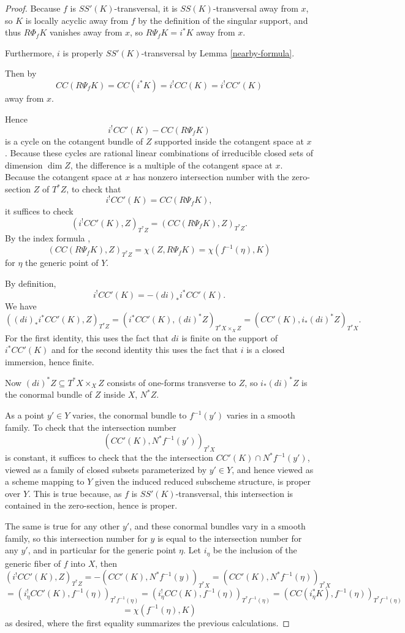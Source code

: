 \begin{proof} Because $f$ is $SS'(K)$-transversal, it is $SS(K)$-transversal away from $x$, so $K$ is locally acyclic away from $f$ by the definition of the singular support, and thus $R \Phi_f K$ vanishes away from $x$, so $R \Psi_f K = i^* K$ away from $x$.

Furthermore, $i$ is properly $SS'(K)$-transversal by Lemma \ref{nearby-formula}.

Then by \cite[Theorem 7.6]{saito1} \[  CC ( R \Psi_{f} K) = CC( i^* K ) = i^! CC(K) = i^! CC'(K) \] away from $x$.

Hence \[i^! CC'(K) -  CC ( R \Psi_{f} K) \] is a cycle on the cotangent bundle of $Z$ supported inside the cotangent space at $x$. Because these cycles are rational linear combinations of irreducible closed sets of dimension $\dim Z$, the difference is a multiple of the cotangent space at $x$. Because the cotangent space at $x$ has nonzero intersection number with the zero-section $Z$ of $T^* Z$, to check that \[ i^! CC'(K) = CC(R\Psi_f K),\] it suffices to check \[ (i^! CC'(K) , Z)_{T^*Z}=   (CC ( R \Psi_{f} K) , Z)_{T^*Z} . \] By the index formula \cite[Theorem 7 .13]{saito1},  \[ (CC ( R \Psi_{f} K) , Z)_{T^*Z} =  \chi(Z, R \Psi_f K) =\chi ( f^{-1}(\eta),K)\] for $\eta$ the generic point of $Y$.

By definition, \[i^! CC'(K) = - (di)_* i^*  CC'(K).\] We have \cite[Proposition 8.1.1(c)]{Fulton}
\[  ((di)_* i^* CC'(K), Z)_{T^*Z} = (i^* CC'(K),  (di)^* Z)_{T^*X \times_X Z} = (CC'(K), i_* (di)^* Z) _{T^*X} .\]
For the first identity, this uses the fact that $di$ is finite on the support of $i^* CC'(K)$ and for the second identity this uses the fact that $i$ is a closed immersion, hence finite.

Now $(di)^ * Z \subseteq  T^* X \times_X Z$ consists of one-forms transverse to $Z$, so $i_* (di)^* Z$ is the conormal bundle of $Z$ inside $X$, $N^*Z$.

As a point $y' \in Y$ varies, the conormal bundle to $f^{-1}(y')$ varies in a smooth family. To check that the intersection number  \[ (CC'(K), N^*f^{-1} (y') )_{T^*X} \] is constant, it suffices to check that the the intersection $ CC'(K) \cap N^*f^{-1} (y') $, viewed as a family of closed subsets parameterized by $y' \in Y$, and hence viewed as a scheme mapping to $Y$ given the induced reduced subscheme structure, is proper over $Y$. This is true because, as $f$ is $SS'(K)$-transversal, this intersection is contained in the zero-section, hence is proper.

The same is true for any other $y'$, and these conormal bundles vary in a smooth family, so this intersection number for $y$ is equal to the intersection number for any $y'$, and in particular for the generic point $\eta$. Let $i_\eta$ be the inclusion of the generic fiber of $f$ into $X$, then \[( i^! CC'(K), Z)_{T^*Z}  = - (CC'(K),  N^* f^{-1}(y))_{T^*X} = (CC'(K), N^* f^{-1}(\eta))_{T^*X}\]
\[ = (i_\eta^! CC'(K), f^{-1}(\eta))_{T^* f^{-1}(\eta)}  =  (i_\eta^! CC(K), f^{-1}(\eta))_{T^* f^{-1}(\eta)} =  ( CC(i_\eta^* K) , f^{-1}(\eta))_{T^* f^{-1}(\eta)}\] \[= \chi(f^{-1}(\eta),K) \] as desired, where the first equality summarizes the previous calculations.\end{proof}

